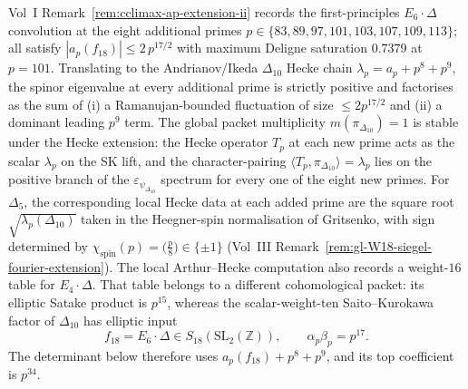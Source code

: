 \begin{remark}
\label{rem:dl-hecke-extension}
\ClaimStatusConditional
{}
Vol~I Remark~\ref{rem:cclimax-ap-extension-ii} records the
first-principles $E_6\cdot\Delta$ convolution at the eight additional primes
$p\in\{83, 89, 97, 101, 103, 107, 109, 113\}$; all satisfy
$|a_p(f_{18})| \le 2\,p^{17/2}$ with maximum Deligne saturation
$0.7379$ at $p = 101$. Translating to the Andrianov/Ikeda
$\Delta_{10}$ Hecke chain $\lambda_p = a_p + p^8 + p^9$, the
spinor eigenvalue at every additional prime is strictly positive and
factorises as the sum of (i) a Ramanujan-bounded fluctuation of
size $\le 2p^{17/2}$ and (ii) a dominant leading $p^9$ term. The
global packet multiplicity
$m(\pi_{\Delta_{10}}) = 1$ is stable under the Hecke
extension: the Hecke operator $T_p$ at each new prime acts as
the scalar $\lambda_p$ on the SK lift, and the character-pairing
$\langle T_p, \pi_{\Delta_{10}}\rangle = \lambda_p$ lies on the
positive branch of the $\varepsilon_{\psi_{\Delta_{10}}}$ spectrum
for every one of the eight new primes. For $\Delta_5$, the
corresponding local Hecke data at each added prime are the square
root $\sqrt{\lambda_p(\Delta_{10})}$ taken in the Heegner-spin
normalisation of Gritsenko, with sign determined by
$\chi_{\mathrm{spin}}(p) = \bigl(\frac{p}{8}\bigr) \in \{\pm 1\}$
(Vol~III Remark~\ref{rem:gl-W18-siegel-fourier-extension}).
The local Arthur--Hecke computation also records a weight-$16$ table
for $E_4\cdot\Delta$. That table belongs to a different cohomological
packet: its elliptic Satake product is $p^{15}$, whereas the
scalar-weight-ten Saito--Kurokawa factor of $\Delta_{10}$ has elliptic
input
\[
 f_{18}=E_6\cdot\Delta\in S_{18}(\mathrm{SL}_2(\mathbb Z)),
 \qquad \alpha_p\beta_p=p^{17}.
\]
The determinant below therefore uses $a_p(f_{18})+p^8+p^9$, and its
top coefficient is $p^{34}$.
\end{remark}

